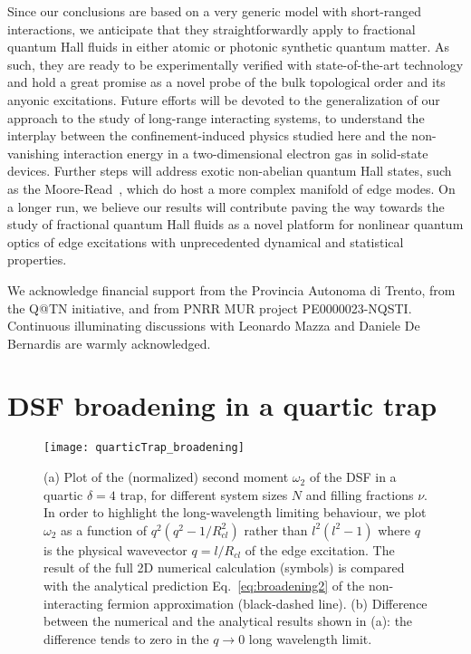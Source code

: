 \documentclass[twocolumn,pra,superscriptaddress,noshowpacs]{revtex4}
\begin{document}
Since our conclusions are based on a very generic model with short-ranged interactions, we anticipate that they straightforwardly apply to fractional quantum Hall fluids in either atomic or photonic synthetic quantum matter.
As such, they are ready to be experimentally verified with state-of-the-art technology and hold a great promise as a novel probe of the bulk topological order and its anyonic excitations. 
Future efforts will be devoted to the generalization of our approach to
the study of long-range interacting systems, to understand the interplay between the confinement-induced physics studied here and the non-vanishing interaction energy in a two-dimensional electron gas in solid-state devices.
Further steps will address exotic non-abelian quantum Hall states, such as the Moore-Read~\cite{MooreRead_NPB_1991}, which do host a more complex manifold of edge modes.
On a longer run, we believe our results will contribute paving the way towards the study of fractional quantum Hall fluids as a novel platform for nonlinear quantum optics of edge excitations with unprecedented dynamical and statistical properties.

\begin{acknowledgements}
    We acknowledge financial support from the Provincia Autonoma di Trento, from the Q@TN initiative, and from PNRR MUR project PE0000023-NQSTI.  Continuous illuminating discussions with Leonardo Mazza and Daniele De Bernardis are warmly acknowledged.
\end{acknowledgements}

\appendix

\section{DSF broadening in a quartic  trap}\label{appendix:broadening}
\begin{figure}[htbp]
   	\begin{adjustbox}{width=.5\textwidth, totalheight=\baselineskip,keepaspectratio,right}
      	\texttt{[image: quarticTrap\_broadening]}
    \end{adjustbox}
    \vspace{0.0cm}\caption{(a) Plot of the (normalized) second moment $\omega_2$ of the DSF in a quartic $\delta=4$ trap, for different system sizes $N$ and filling fractions $\nu$. In order to highlight the long-wavelength limiting behaviour, we plot $\omega_2$ as a function of $q^2(q^2-1/R_{cl}^2)$ rather than $l^2(l^2-1)$ where $q$ is the physical wavevector $q=l/R_{cl}$ of the edge excitation. The result of the full 2D numerical calculation (symbols) is compared with the analytical prediction Eq.~\eqref{eq:broadening2} of the non-interacting fermion approximation (black-dashed line). (b) Difference between the numerical and the analytical results shown in (a): the difference tends to zero in the $q\to 0$ long wavelength limit. 
    \label{fig:quarticTrapBroadening}}
\end{figure}
\end{document}
